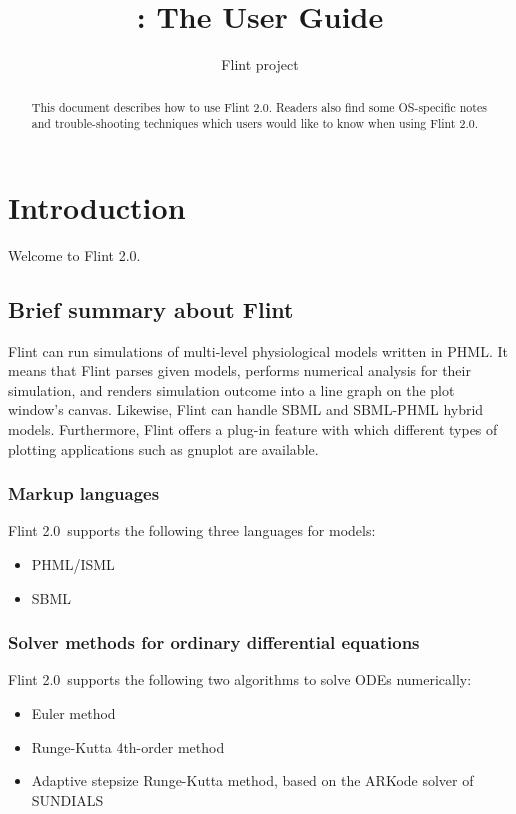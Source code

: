 \documentclass[a4paper,10pt]{report}
\title{\Flint: The User Guide}
\author{Flint project}
\def\FlintVersion{2.0}
\def\Flint{Flint \FlintVersion}
\begin{document}
\maketitle

\begin{abstract}
This document describes how to use \Flint.
Readers also find some OS-specific notes and trouble-shooting techniques which
users would like to know when using \Flint.
\end{abstract}

\tableofcontents



\chapter{Introduction}
Welcome to \Flint.

\section{Brief summary about Flint}
Flint can run simulations of multi-level physiological models written in PHML.
It means that Flint parses given models, performs numerical analysis for their
simulation, and renders simulation outcome into a line graph on the plot
window's canvas. Likewise, Flint can handle SBML and SBML-PHML hybrid models.
Furthermore, Flint offers a plug-in feature with which different types of
plotting applications such as gnuplot are available.

\subsection{Markup languages}
\Flint\ supports the following three languages for models:
\begin{itemize}
\item PHML/ISML
\item SBML
\end{itemize}

\subsection{Solver methods for ordinary differential equations}
\Flint\ supports the following two algorithms to solve ODEs numerically:
\begin{itemize}
\item Euler method
\item Runge-Kutta 4th-order method
\item Adaptive stepsize Runge-Kutta method, based on the ARKode solver of SUNDIALS
\end{itemize}
\end{document}
